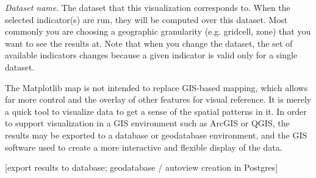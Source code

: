 \emph{Dataset name}. The dataset that this visualization corresponds
to. When the selected indicator(s) are run, they will be computed over
this dataset. Most commonly you are choosing a geographic granularity
(e.g. gridcell, zone) that you want to see the results at. Note that
when you change the dataset, the set of available indicators changes
because a given indicator is valid only for a single dataset.


The Matplotlib map is not intended to replace GIS-based mapping, which
allows far more control and the overlay of other features for visual
reference.  It is merely a quick tool to visualize data to get a sense
of the spatial patterns in it.  In order to support visualization in a
GIS environment such as ArcGIS or QGIS, the results may be exported to
a database or geodatabase environment, and the GIS software used to
create a more interactive and flexible display of the data.




[export results to database; geodatabase / autoview creation in
Postgres]



